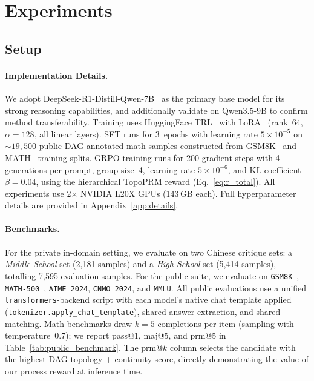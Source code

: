 \section{Experiments}
\label{sec:experiments}

\subsection{Setup}
\label{sec:setup}

\paragraph{Implementation Details.}
We adopt DeepSeek-R1-Distill-Qwen-7B~\citep{guo2025deepseekr1} as the primary base model for its strong reasoning capabilities, and additionally validate on Qwen3.5-9B to confirm method transferability.
Training uses HuggingFace TRL~\citep{vonwerra2022trl} with LoRA~\citep{hu2022lora} (rank~64, $\alpha{=}128$, all linear layers).
SFT runs for 3~epochs with learning rate $5{\times}10^{-5}$ on ${\sim}19{,}500$ public DAG-annotated math samples constructed from GSM8K~\citep{cobbe2021gsm8k} and MATH~\citep{hendrycks2021math} training splits.
GRPO training runs for 200 gradient steps with 4 generations per prompt, group size~4, learning rate $5{\times}10^{-6}$, and KL coefficient $\beta{=}0.04$, using the hierarchical TopoPRM reward (Eq.~\ref{eq:r_total}).
All experiments use 2$\times$ NVIDIA L20X GPUs (143\,GB each).
Full hyperparameter details are provided in Appendix~\ref{app:details}.

\paragraph{Benchmarks.}
For the private in-domain setting, we evaluate on two Chinese critique
sets: a \emph{Middle School} set (2{,}181 samples) and a \emph{High
School} set (5{,}414 samples), totalling 7{,}595 evaluation samples.
For the public suite, we evaluate on
\texttt{GSM8K}~\citep{cobbe2021gsm8k},
\texttt{MATH-500}~\citep{hendrycks2021math},
\texttt{AIME\,2024}, \texttt{CNMO\,2024}, and \texttt{MMLU}.
All public evaluations use a unified \texttt{transformers}-backend script
with each model's native chat template applied (\texttt{tokenizer.apply\_chat\_template}),
shared answer extraction, and shared matching.
Math benchmarks draw $k{=}5$ completions per item (sampling with temperature~$0.7$);
we report pass@1, maj@5, and prm@5 in Table~\ref{tab:public_benchmark}.
The prm@$k$ column selects the candidate with the highest DAG topology + continuity score,
directly demonstrating the value of our process reward at inference time.



